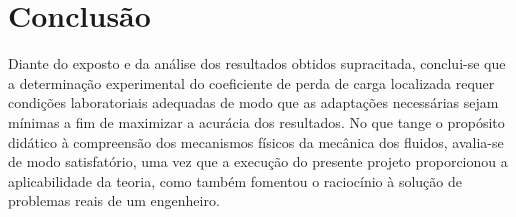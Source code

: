 \chapter{Conclusão}
\label{chap:conclusao}

Diante do exposto e da análise dos resultados obtidos supracitada, conclui-se
que a determinação experimental do coeficiente de perda de carga localizada
requer condições laboratoriais adequadas de modo que as adaptações necessárias
sejam mínimas a fim de maximizar a acurácia dos resultados. No que tange o
propósito didático à compreensão dos mecanismos físicos da mecânica dos fluidos,
avalia-se de modo satisfatório, uma vez que a execução do presente projeto
proporcionou a aplicabilidade da teoria, como também fomentou o raciocínio à
solução de problemas reais de um engenheiro.

